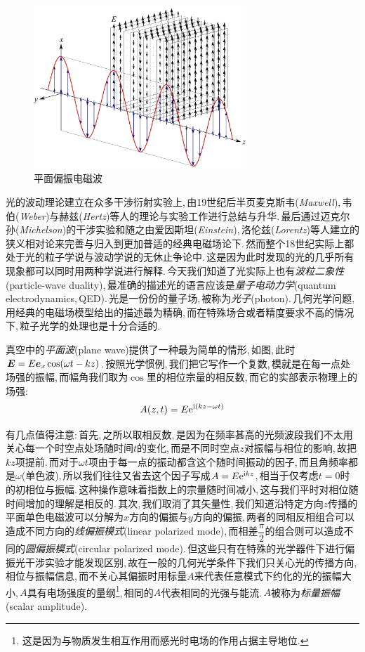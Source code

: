 \begin{figure}
\centering
\includegraphics[width=8cm]{image/5-6-2.png}
\caption{平面偏振电磁波}
\end{figure}
光的波动理论建立在众多干涉衍射实验上,\,由19世纪后半页麦克斯韦({\it Maxwell}),\,韦伯({\it Weber})与赫兹({\it Hertz})等人的理论与实验工作进行总结与升华.\,最后通过迈克尔孙({\it Michelson})的干涉实验和随之由爱因斯坦({\it Einstein}),\,洛伦兹({\it Lorentz})等人建立的狭义相对论来完善与归入到更加普适的经典电磁场论下.\,然而整个18世纪实际上都处于光的粒子学说与波动学说的无休止争论中.\,这是因为此时发现的光的几乎所有现象都可以同时用两种学说进行解释.\,今天我们知道了光实际上也有\emph{波粒二象性}(particle-wave duality),\,最准确的描述光的语言应该是\emph{量子电动力学}(quantum electrodynamics,\,QED).\,光是一份份的量子场,\,被称为\emph{光子}(photon).\,几何光学问题,\,用经典的电磁场模型给出的描述最为精确,\,而在特殊场合或者精度要求不高的情况下,\,粒子光学的处理也是十分合适的.

真空中的\emph{平面波}(plane wave)提供了一种最为简单的情形,\,如图,\,此时$\boldsymbol{E}=E\boldsymbol{e}_x\cos(\omega t-kz)$.\,按照光学惯例,\,我们把它写作一个复数,\,模就是在每一点处场强的振幅,\,而幅角我们取为$\cos$里的相位宗量的相反数,\,而它的实部表示物理上的场强:
\[A(z,t)=E{\rm e}^{{\rm i}(kz-\omega t)}\]

有几点值得注意:\,首先,\,之所以取相反数,\,是因为在频率甚高的光频波段我们不太用关心每一个时空点处场随时间$t$的变化,\,而是不同时空点$z$对振幅与相位的影响,\,故把$kz$项提前.\,而对于$\omega t$项由于每一点的振动都含这个随时间振动的因子,\,而且角频率都是$\omega$(单色波),\,所以我们往往又省去这个因子写成$A=E{\rm e}^{{\rm i} kz}$,\,相当于仅考虑$t=0$时的初相位与振幅.\,这种操作意味着指数上的宗量随时间减小,\,这与我们平时对相位随时间增加的理解是相反的.\,其次,\,我们取消了其矢量性,\,我们知道沿特定方向$z$传播的平面单色电磁波可以分解为$x$方向的偏振与$y$方向的偏振,\,两者的同相反相组合可以造成不同方向的\emph{线偏振模式}(linear polarized mode),\,而相差$\dfrac{\pi}{2}$的组合则可以造成不同的\emph{圆偏振模式}(circular polarized mode).\,但这些只有在特殊的光学器件下进行偏振光干涉实验才能发现区别,\,故在一般的几何光学条件下我们只关心光的传播方向,\,相位与振幅信息,\,而不关心其偏振时用标量$A$来代表任意模式下约化的光的振幅大小,\,$A$具有电场强度的量纲\footnote{这是因为与物质发生相互作用而感光时电场的作用占据主导地位.},\,相同的$A$代表相同的光强与能流.\,$A$被称为\emph{标量振幅}(scalar amplitude).

